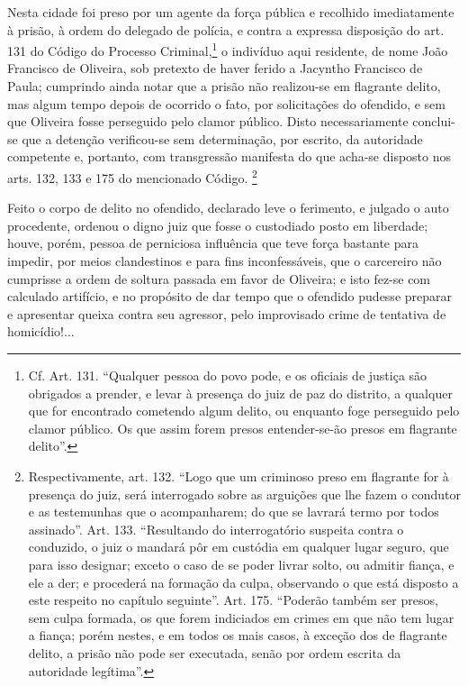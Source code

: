 Nesta cidade foi preso por um agente da força pública e recolhido
imediatamente à prisão, à ordem do delegado de polícia, e contra a
expressa disposição do art. 131 do Código do Processo
Criminal,\footnote{ Cf. Art. 131. ``Qualquer pessoa do povo pode, e os
  oficiais de justiça são obrigados a prender, e levar à presença do
  juiz de paz do distrito, a qualquer que for encontrado cometendo algum
  delito, ou enquanto foge perseguido pelo clamor público. Os que assim
  forem presos entender-se-ão presos em flagrante delito''.} o indivíduo
aqui residente, de nome João Francisco de Oliveira, sob pretexto de
haver ferido a Jacyntho Francisco de Paula; cumprindo ainda notar que a
prisão não realizou-se em flagrante delito, mas algum tempo depois de
ocorrido o fato, por solicitações do ofendido, e sem que Oliveira fosse
perseguido pelo clamor público. Disto necessariamente conclui-se que a
detenção verificou-se sem determinação, por escrito, da autoridade
competente e, portanto, com transgressão manifesta do que acha-se
disposto nos arts. 132, 133 e 175 do mencionado Código. \footnote{
  Respectivamente, art. 132. ``Logo que um criminoso preso em flagrante
  for à presença do juiz, será interrogado sobre as arguições que lhe
  fazem o condutor e as testemunhas que o acompanharem; do que se
  lavrará termo por todos assinado''. Art. 133. ``Resultando do
  interrogatório suspeita contra o conduzido, o juiz o mandará pôr em
  custódia em qualquer lugar seguro, que para isso designar; exceto o
  caso de se poder livrar solto, ou admitir fiança, e ele a der; e
  procederá na formação da culpa, observando o que está disposto a este
  respeito no capítulo seguinte''. Art. 175. ``Poderão também ser presos,
  sem culpa formada, os que forem indiciados em crimes em que não tem
  lugar a fiança; porém nestes, e em todos os mais casos, à exceção dos
  de flagrante delito, a prisão não pode ser executada, senão por ordem
  escrita da autoridade legítima''.}

Feito o corpo de delito no ofendido, declarado leve o ferimento, e
julgado o auto procedente, ordenou o digno juiz que fosse o custodiado
posto em liberdade; houve, porém, pessoa de perniciosa influência que
teve força bastante para impedir, por meios clandestinos e para fins
inconfessáveis, que o carcereiro não cumprisse a ordem de soltura
passada em favor de Oliveira; e isto fez-se com calculado artifício, e
no propósito de dar tempo que o ofendido pudesse preparar e apresentar
queixa contra seu agressor, pelo improvisado crime de tentativa de
homicídio!...

